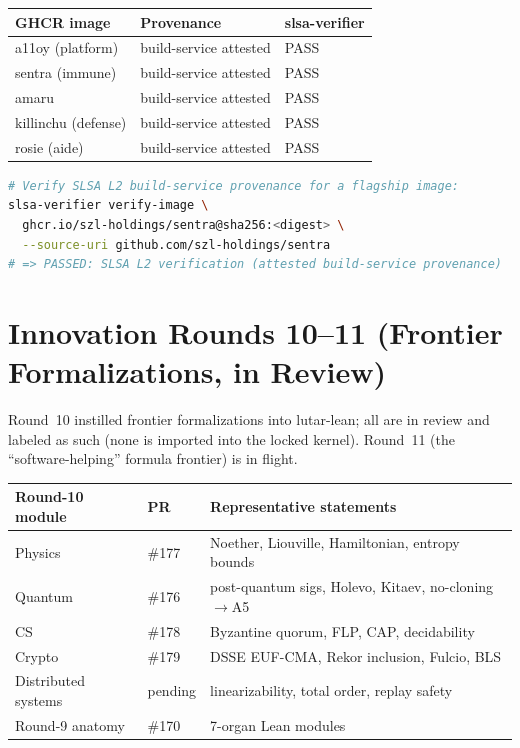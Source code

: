 \documentclass[11pt]{article}
\theoremstyle{plain}
\theoremstyle{definition}
\theoremstyle{remark}
\begin{document}
\begin{center}
\begin{tabular}{@{}lll@{}}
\toprule
\textbf{GHCR image} & \textbf{Provenance} & \textbf{slsa-verifier} \\
\midrule
a11oy (platform) & build-service attested & PASS \\
sentra (immune) & build-service attested & PASS \\
amaru & build-service attested & PASS \\
killinchu (defense) & build-service attested & PASS \\
rosie (aide) & build-service attested & PASS \\
\bottomrule
\end{tabular}
\end{center}

\begin{lstlisting}[language=bash]
# Verify SLSA L2 build-service provenance for a flagship image:
slsa-verifier verify-image \
  ghcr.io/szl-holdings/sentra@sha256:<digest> \
  --source-uri github.com/szl-holdings/sentra
# => PASSED: SLSA L2 verification (attested build-service provenance)
\end{lstlisting}

\section{Innovation Rounds 10--11 (Frontier Formalizations, in Review)}

Round~10 instilled frontier formalizations into lutar-lean; all are in review and
labeled as such (none is imported into the locked kernel). Round~11 (the
``software-helping'' formula frontier) is in flight.

\begin{center}
\begin{tabular}{@{}lll@{}}
\toprule
\textbf{Round-10 module} & \textbf{PR} & \textbf{Representative statements} \\
\midrule
Physics & \#177 & Noether, Liouville, Hamiltonian, entropy bounds \\
Quantum & \#176 & post-quantum sigs, Holevo, Kitaev, no-cloning$\to$A5 \\
CS & \#178 & Byzantine quorum, FLP, CAP, decidability \\
Crypto & \#179 & DSSE EUF-CMA, Rekor inclusion, Fulcio, BLS \\
Distributed systems & pending & linearizability, total order, replay safety \\
Round-9 anatomy & \#170 & 7-organ Lean modules \\
\bottomrule
\end{tabular}
\end{center}
\end{document}

